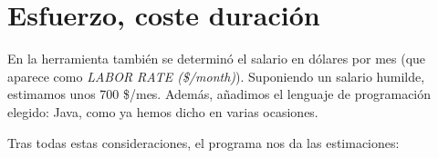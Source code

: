 \documentclass[spanish,a4paper,11pt, twoside]{report}	%
\begin{document}
\vspace{0.35cm}
\hspace{3cm}
\vspace{0.35cm}

\section{Esfuerzo, coste  duración}
En la herramienta también se determinó el salario en dólares por mes (que aparece como \textit{LABOR RATE (\$/month)}). Suponiendo un salario humilde, estimamos unos 700 \$/mes. Además, añadimos el lenguaje de programación elegido: Java, como ya hemos dicho en varias ocasiones. 


\vspace{0.35cm}
\hspace{-3.2cm}
\vspace{0.35cm}

Tras todas estas consideraciones, el programa nos da las estimaciones:
\end{document}
